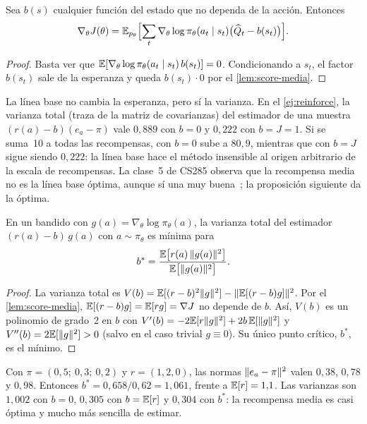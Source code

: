 \begin{proposicion}\label{prop:baseline}
Sea $b(s)$ cualquier función del estado que no dependa de la acción. Entonces
\[
\nabla_\theta J(\theta)=\mathbb{E}_{p_\theta}\Bigl[\sum_t\nabla_\theta\log\pi_\theta(a_t\mid s_t)\bigl(\widehat Q_t-b(s_t)\bigr)\Bigr].
\]
\end{proposicion}

\begin{proof}
Basta ver que $\mathbb{E}[\nabla_\theta\log\pi_\theta(a_t\mid s_t)\,b(s_t)]=0$. Condicionando a $s_t$, el factor $b(s_t)$ sale de la esperanza y queda $b(s_t)\cdot 0$ por el \cref{lem:score-media}.
\end{proof}

La línea base no cambia la esperanza, pero sí la varianza. En el \cref{ej:reinforce}, la varianza total (traza de la matriz de covarianzas) del estimador de una muestra $(r(a)-b)(e_a-\pi)$ vale $0{,}889$ con $b=0$ y $0{,}222$ con $b=J=1$. Si se suma~10 a todas las recompensas, con $b=0$ sube a $80{,}9$, mientras que con $b=J$ sigue siendo $0{,}222$: la línea base hace el método insensible al origen arbitrario de la escala de recompensas. La clase~5 de CS285 observa que la recompensa media no es la línea base óptima, aunque sí una muy buena~\cite{cs285}; la proposición siguiente da la óptima.

\begin{proposicion}\label{prop:baseline-optima}
En un bandido con $g(a)=\nabla_\theta\log\pi_\theta(a)$, la varianza total del estimador $(r(a)-b)\,g(a)$ con $a\sim\pi_\theta$ es mínima para
\[
b^{*}=\frac{\mathbb{E}\bigl[r(a)\,\lVert g(a)\rVert^{2}\bigr]}{\mathbb{E}\bigl[\lVert g(a)\rVert^{2}\bigr]}.
\]
\end{proposicion}

\begin{proof}
La varianza total es $V(b)=\mathbb{E}[(r-b)^{2}\lVert g\rVert^{2}]-\lVert\mathbb{E}[(r-b)g]\rVert^{2}$. Por el \cref{lem:score-media}, $\mathbb{E}[(r-b)g]=\mathbb{E}[rg]=\nabla J$ no depende de $b$. Así, $V(b)$ es un polinomio de grado~2 en $b$ con $V'(b)=-2\mathbb{E}[r\lVert g\rVert^{2}]+2b\,\mathbb{E}[\lVert g\rVert^{2}]$ y $V''(b)=2\mathbb{E}[\lVert g\rVert^{2}]>0$ (salvo en el caso trivial $g\equiv 0$). Su único punto crítico, $b^{*}$, es el mínimo.
\end{proof}

\begin{ejemplo}\label{ej:baseline-optima}
Con $\pi=(0{,}5;\ 0{,}3;\ 0{,}2)$ y $r=(1,2,0)$, las normas $\lVert e_a-\pi\rVert^{2}$ valen $0{,}38$, $0{,}78$ y $0{,}98$. Entonces $b^{*}=0{,}658/0{,}62=1{,}061$, frente a $\mathbb{E}[r]=1{,}1$. Las varianzas son $1{,}002$ con $b=0$, $0{,}305$ con $b=\mathbb{E}[r]$ y $0{,}304$ con $b^{*}$: la recompensa media es casi óptima y mucho más sencilla de estimar.
\end{ejemplo}


